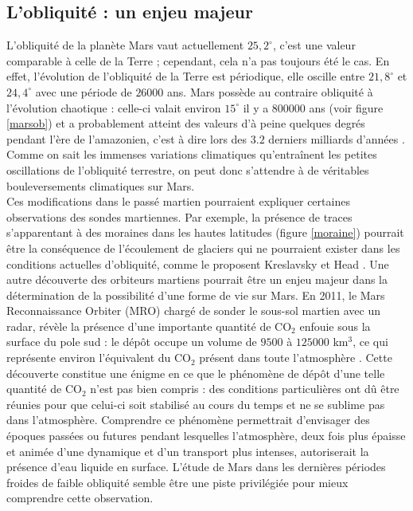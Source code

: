 \documentclass[11pt,a4paper]{article}
\begin{document}
\subsection{L'obliquité : un enjeu majeur}
L'obliquité de la planète Mars vaut actuellement $25,2^{\circ}$, c'est une valeur comparable à celle de la Terre ; cependant, cela n'a pas toujours été le cas. En effet, l'évolution de l'obliquité de la Terre est périodique, elle oscille entre $21,8^{\circ}$ et $24,4^{\circ}$ avec une période de $26000$ ans. Mars possède au contraire obliquité à l'évolution chaotique : celle-ci valait environ $15^{\circ}$ il y a $800000$ ans (voir figure \ref{marsob}) et a probablement atteint des valeurs d'à peine quelques degrés pendant l'ère de l'amazonien, c'est à dire lors des $3.2$ derniers milliards d'années \citep{Lask:04}. Comme on sait les immenses variations climatiques qu'entraînent les petites oscillations de l'obliquité terrestre, on peut donc s'attendre à de véritables bouleversements climatiques sur Mars. \\

Ces modifications dans le passé martien pourraient expliquer certaines observations des sondes martiennes.  Par exemple, la présence de traces s'apparentant à des moraines dans les hautes latitudes (figure \ref{moraine}) pourrait être la conséquence de l'écoulement de glaciers qui ne pourraient exister dans les conditions actuelles d'obliquité, comme le proposent Kreslavsky et Head \citep{Kres:05}. Une autre découverte des orbiteurs martiens pourrait être un enjeu majeur dans la détermination de la possibilité d'une forme de vie sur Mars. En 2011, le Mars Reconnaissance Orbiter (MRO) chargé de sonder le sous-sol martien avec un radar, révèle la présence d'une importante quantité de CO$_2$ enfouie sous la surface du pole sud : le dépôt occupe un volume de $9500$ à $125000$ km$^3$, ce qui représente environ l'équivalent du CO$_2$ présent dans toute l'atmosphère \citep{Phil:11}. Cette découverte constitue une énigme en ce que le phénomène de dépôt d'une telle quantité de CO$_2$ n'est pas bien compris : des conditions particulières ont dû être réunies pour que celui-ci soit stabilisé au cours du temps et ne se sublime pas dans l'atmosphère. Comprendre ce phénomène permettrait d'envisager des époques passées ou futures pendant lesquelles l'atmosphère, deux fois plus épaisse et animée d'une dynamique et d'un transport plus intenses, autoriserait la présence d'eau liquide en surface. L'étude de Mars dans les dernières périodes froides de faible obliquité semble être une piste privilégiée pour mieux comprendre cette observation. \\
\end{document}
